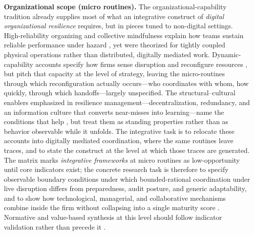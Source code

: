 \textbf{Organizational scope (micro routines).} The organizational-capability tradition already supplies most of what an integrative construct of \emph{digital organizational resilience} requires, but in pieces tuned to non-digital settings. High-reliability organizing and collective mindfulness explain how teams sustain reliable performance under hazard \autocite{vogus2007organizational,weick2011managing}, yet were theorized for tightly coupled physical operations rather than distributed, digitally mediated work. Dynamic-capability accounts specify how firms sense disruption and reconfigure resources \autocite{sambamurthy2003shaping,teece2007explicating,pavlou2010elusive,lengnick2011developing,duchek2019organizational}, but pitch that capacity at the level of strategy, leaving the micro-routines through which reconfiguration actually occurs---who coordinates with whom, how quickly, through which handoffs---largely unspecified. The structural--cultural enablers emphasized in resilience management---decentralization, redundancy, and an information culture that converts near-misses into learning---name the conditions that help \autocite{westrum2004typology,bhamra2011resilience,burnard2011organisational}, but treat them as standing properties rather than as behavior observable while it unfolds. The integrative task is to relocate these accounts into digitally mediated coordination, where the same routines leave traces, and to state the construct at the level at which those traces are generated. The matrix marks \emph{integrative frameworks} at micro routines as low-opportunity until core indicators exist; the concrete research task is therefore to specify observable boundary conditions under which bounded-rational coordination \autocite{march1993organizations,simon1997administrative} under live disruption differs from preparedness, audit posture, and generic adaptability, and to show how technological, managerial, and collaborative mechanisms combine inside the firm without collapsing into a single maturity score \autocite{hillmann2021organizational,hepfer2022heterogeneity,boh2023building}. Normative and value-based synthesis at this level should follow indicator validation rather than precede it \autocite{woods2015four}.

